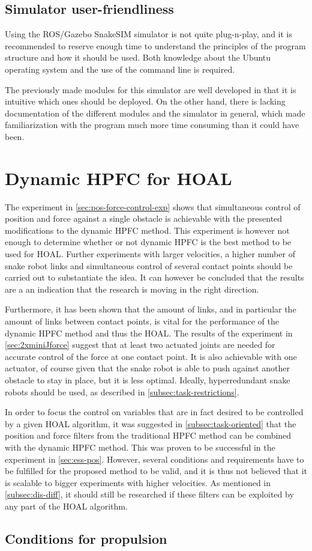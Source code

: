\subsection{Simulator user-friendliness}

Using the ROS/Gazebo SnakeSIM simulator is not quite plug-n-play, and it is recommended to reserve enough time to understand the principles of the program structure and how it should be used. Both knowledge about the Ubuntu operating system and the use of the command line is required.

The previously made modules for this simulator are well developed in that it is intuitive which ones should be deployed. On the other hand, there is lacking documentation of the different modules and the simulator in general, which made familiarization with the program much more time consuming than it could have been.

\section{Dynamic HPFC for HOAL}

The experiment in \ref{sec:pos-force-control-exp} shows that simultaneous control of position and force against a single obstacle is achievable with the presented modifications to the dynamic HPFC method. This experiment is however not enough to determine whether or not dynamic HPFC is the best method to be used for HOAL. Further experiments with larger velocities, a higher number of snake robot links and simultaneous control of several contact points should be carried out to substantiate the idea. It can however be concluded that the results are a an indication that the research is moving in the right direction.

Furthermore, it has been shown that the amount of links, and in particular the amount of links between contact points, is vital for the performance of the dynamic HPFC method and thus the HOAL. The results of the experiment in \ref{sec:2xminiJforce} suggest that at least two actuated joints are needed for accurate control of the force at one contact point. It is also achievable with one actuator, of course given that the snake robot is able to push against another obstacle to stay in place, but it is less optimal. Ideally, hyperredundant snake robots should be used, as described in \ref{subsec:task-restrictions}.

In order to focus the control on variables that are in fact desired to be controlled by a given HOAL algorithm, it was suggested in \ref{subsec:task-oriented} that the position and force filters from the traditional HPFC method can be combined with the dynamic HPFC method. This was proven to be successful in the experiment in \ref{sec:ess-pos}. However, several conditions and requirements have to be fulfilled for the proposed method to be valid, and it is thus not believed that it is scalable to bigger experiments with higher velocities. As mentioned in \ref{subsec:dis-diff}, it should still be researched if these filters can be exploited by any part of the HOAL algorithm.

\subsection{Conditions for propulsion}